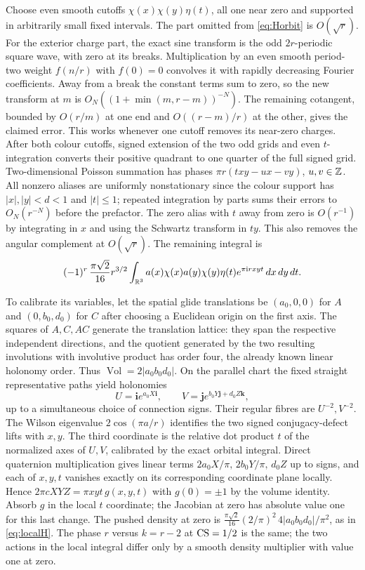 Choose even smooth cutoffs \(\chi(x)\chi(y)\eta(t)\), all one near zero and supported in arbitrarily small fixed intervals. The part omitted from \eqref{eq:Horbit} is \(O(\sqrt r)\). For the exterior charge part, the exact sine transform is the odd \(2r\)-periodic square wave, with zero at its breaks. Multiplication by an even smooth period-two weight \(f(n/r)\) with \(f(0)=0\) convolves it with rapidly decreasing Fourier coefficients. Away from a break the constant terms sum to zero, so the new transform at \(m\) is \(O_N((1+\min(m,r-m))^{-N})\). The remaining cotangent, bounded by \(O(r/m)\) at one end and \(O((r-m)/r)\) at the other, gives the claimed error. This works whenever one cutoff removes its near-zero charges. After both colour cutoffs, signed extension of the two odd grids and even \(t\)-integration converts their positive quadrant to one quarter of the full signed grid. Two-dimensional Poisson summation has phases \(\pi r(txy-u x-vy)\), \(u,v\in\mathbb Z\). All nonzero aliases are uniformly nonstationary since the colour support has \(|x|,|y|<d<1\) and \(|t|\le1\); repeated integration by parts sums their errors to \(O_N(r^{-N})\) before the prefactor. The zero alias with \(t\) away from zero is \(O(r^{-1})\) by integrating in \(x\) and using the Schwartz transform in \(ty\). This also removes the angular complement at \(O(\sqrt r)\). The remaining integral is
\[
 (-1)^r\,\frac{\pi\sqrt2}{16}r^{3/2}
 \int_{\mathbb R^3} a(x)\chi(x)a(y)\chi(y)\eta(t)e^{\pi\mathrm i r xyt}\,dx\,dy\,dt .
\]

To calibrate its variables, let the spatial glide translations be \((a_0,0,0)\) for \(A\) and \((0,b_0,d_0)\) for \(C\) after choosing a Euclidean origin on the first axis. The squares of \(A,C,AC\) generate the translation lattice: they span the respective independent directions, and the quotient generated by the two resulting involutions with involutive product has order four, the already known linear holonomy order. Thus \(\operatorname{Vol}=2|a_0b_0d_0|\). On the parallel chart the fixed straight representative paths yield holonomies
\[
 U=\mathbf i e^{a_0X\mathbf i},\qquad V=\mathbf j e^{b_0Y\mathbf j+d_0Z\mathbf k},
\]
up to a simultaneous choice of connection signs. Their regular fibres are \(U^{-2},V^{-2}\). The Wilson eigenvalue \(2\cos(\pi a/r)\) identifies the two signed conjugacy-defect lifts with \(x,y\). The third coordinate is the relative dot product \(t\) of the normalized axes of \(U,V\), calibrated by the exact orbital integral. Direct quaternion multiplication gives linear terms \(2a_0X/\pi,\,2b_0Y/\pi,\,d_0Z\) up to signs, and each of \(x,y,t\) vanishes exactly on its corresponding coordinate plane locally. Hence \(2\pi cXYZ=\pi xyt\,g(x,y,t)\) with \(g(0)=\pm1\) by the volume identity. Absorb \(g\) in the local \(t\) coordinate; the Jacobian at zero has absolute value one for this last change. The pushed density at zero is
\(\frac{\pi\sqrt2}{16}(2/\pi)^2\, 4|a_0b_0d_0|/\pi^2\), as in \eqref{eq:localH}. The phase \(r\) versus \(k=r-2\) at \(\operatorname{CS}=1/2\) is the same; the two actions in the local integral differ only by a smooth density multiplier with value one at zero.

